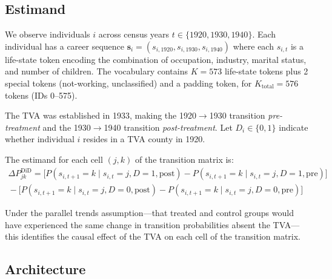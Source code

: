\documentclass[12pt]{article}
\begin{document}
\subsection{Estimand}

We observe individuals $i$ across census years $t \in \{1920, 1930, 1940\}$. Each individual has a career sequence $\mathbf{s}_i = (s_{i,1920}, s_{i,1930}, s_{i,1940})$ where each $s_{i,t}$ is a life-state token encoding the combination of occupation, industry, marital status, and number of children. The vocabulary contains $K = 573$ life-state tokens plus 2 special tokens (not-working, unclassified) and a padding token, for $K_{\text{total}} = 576$ tokens (IDs 0--575).

The TVA was established in 1933, making the 1920$\to$1930 transition \textit{pre-treatment} and the 1930$\to$1940 transition \textit{post-treatment}. Let $D_i \in \{0,1\}$ indicate whether individual $i$ resides in a TVA county in 1920.

The estimand for each cell $(j,k)$ of the transition matrix is:
\begin{multline}
\Delta P_{jk}^{\text{DiD}} = \bigl[P(s_{i,t+1} = k \mid s_{i,t} = j, D=1, \text{post}) - P(s_{i,t+1} = k \mid s_{i,t} = j, D=1, \text{pre})\bigr] \\
{} - \bigl[P(s_{i,t+1} = k \mid s_{i,t} = j, D=0, \text{post}) - P(s_{i,t+1} = k \mid s_{i,t} = j, D=0, \text{pre})\bigr]
\end{multline}

Under the parallel trends assumption---that treated and control groups would have experienced the same change in transition probabilities absent the TVA---this identifies the causal effect of the TVA on each cell of the transition matrix.

\subsection{Architecture}
\end{document}
